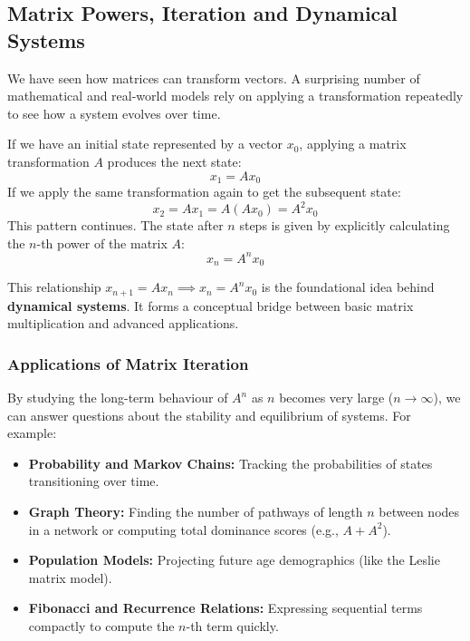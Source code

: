 
\subsection{Matrix Powers, Iteration and Dynamical Systems}

We have seen how matrices can transform vectors. A surprising number of mathematical and real-world models rely on applying a transformation repeatedly to see how a system evolves over time. 

If we have an initial state represented by a vector $x_0$, applying a matrix transformation $A$ produces the next state:
\[
x_1 = Ax_0
\]
If we apply the same transformation again to get the subsequent state:
\[
x_2 = Ax_1 = A(Ax_0) = A^2 x_0
\]
This pattern continues. The state after $n$ steps is given by explicitly calculating the $n$-th power of the matrix $A$:
\[
x_n = A^n x_0
\]

This relationship $x_{n+1} = A x_n \implies x_n = A^n x_0$ is the foundational idea behind \textbf{dynamical systems}. It forms a conceptual bridge between basic matrix multiplication and advanced applications. 

\subsubsection*{Applications of Matrix Iteration}
By studying the long-term behaviour of $A^n$ as $n$ becomes very large ($n \to \infty$), we can answer questions about the stability and equilibrium of systems. For example:
\begin{itemize}[leftmargin=*]
  \item \textbf{Probability and Markov Chains:} Tracking the probabilities of states transitioning over time.
  \item \textbf{Graph Theory:} Finding the number of pathways of length $n$ between nodes in a network or computing total dominance scores (e.g., $A + A^2$).
  \item \textbf{Population Models:} Projecting future age demographics (like the Leslie matrix model).
  \item \textbf{Fibonacci and Recurrence Relations:} Expressing sequential terms compactly to compute the $n$-th term quickly.
\end{itemize}

\bigskip

